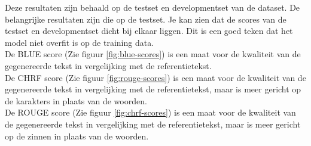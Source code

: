 Deze resultaten zijn behaald op de testset en developmentset van de dataset.
De belangrijke resultaten zijn die op de testset.
Je kan zien dat de scores van de testset en developmentset dicht bij elkaar liggen.
Dit is een goed teken dat het model niet overfit is op de training data.\\
De BLUE score (Zie figuur \ref{fig:blue-scores}) is een maat voor de kwaliteit van de gegenereerde tekst in vergelijking met de referentietekst.\\
De CHRF score (Zie figuur \ref{fig:rouge-scores}) is een maat voor de kwaliteit van de gegenereerde tekst in vergelijking met de referentietekst, maar is meer gericht op de karakters in plaats van de woorden.\\
De ROUGE score (Zie figuur \ref{fig:chrf-scores}) is een maat voor de kwaliteit van de gegenereerde tekst in vergelijking met de referentietekst, maar is meer gericht op de zinnen in plaats van de woorden.\\

